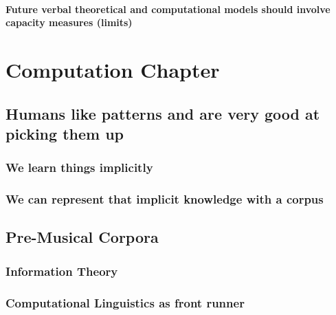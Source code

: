 \documentclass[]{book}
\theoremstyle{definition}
\theoremstyle{definition}
\theoremstyle{definition}
\theoremstyle{remark}
\begin{document}
\hypertarget{future-verbal-theoretical-and-computational-models-should-involve-capacity-measures-limits}{%
\subsubsection{Future verbal theoretical and computational models should
involve capacity measures
(limits)}\label{future-verbal-theoretical-and-computational-models-should-involve-capacity-measures-limits}}

\hypertarget{computation-chapter}{%
\chapter{Computation Chapter}\label{computation-chapter}}

\hypertarget{humans-like-patterns-and-are-very-good-at-picking-them-up}{%
\section{Humans like patterns and are very good at picking them
up}\label{humans-like-patterns-and-are-very-good-at-picking-them-up}}

\hypertarget{we-learn-things-implicitly}{%
\subsection{We learn things
implicitly}\label{we-learn-things-implicitly}}

\hypertarget{we-can-represent-that-implicit-knowledge-with-a-corpus}{%
\subsection{We can represent that implicit knowledge with a
corpus}\label{we-can-represent-that-implicit-knowledge-with-a-corpus}}

\hypertarget{pre-musical-corpora}{%
\section{Pre-Musical Corpora}\label{pre-musical-corpora}}

\hypertarget{information-theory}{%
\subsection{Information Theory}\label{information-theory}}

\hypertarget{computational-linguistics-as-front-runner}{%
\subsection{Computational Linguistics as front
runner}\label{computational-linguistics-as-front-runner}}
\end{document}
